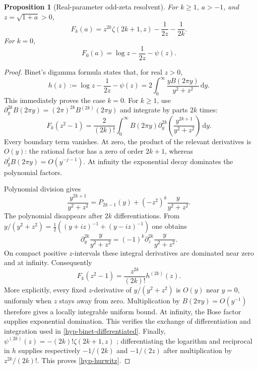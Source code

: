 \documentclass[11pt,a4paper]{article}
\numberwithin{equation}{section}
\newtheorem{proposition}[theorem]{Proposition}
\theoremstyle{definition}
\theoremstyle{remark}
\newcommand{\dd}{\,\mathrm d}
\begin{document}
\begin{proposition}[Real-parameter odd-zeta resolvent]\label{hyp-hurwitz-prop}
For $k\geq1$, $a>-1$, and $z=\sqrt{1+a}>0$,
\begin{equation}\label{hyp-hurwitz}
F_k(a)=z^{2k}\zeta(2k+1,z)-\frac1{2z}-\frac1{2k}.
\end{equation}
For $k=0$,
\begin{equation}\label{hyp-digamma}
F_0(a)=\log z-\frac1{2z}-\psi(z).
\end{equation}
\end{proposition}
\begin{proof}
Binet's digamma formula \cite{dlmf-binet} states that, for real $z>0$,
\begin{equation}\label{hyp-binet-base}
h(z):=\log z-\frac1{2z}-\psi(z)
=2\int_0^\infty\frac{yB(2\pi y)}{y^2+z^2}\dd y.
\end{equation}
This immediately proves the case $k=0$. For $k\geq1$, use
$\partial_y^{2k}B(2\pi y)=(2\pi)^{2k}B^{(2k)}(2\pi y)$
and integrate by parts $2k$ times:
\[
F_k(z^2-1)=\frac2{(2k)!}\int_0^\infty B(2\pi y)
\partial_y^{2k}\!\left(\frac{y^{2k+1}}{y^2+z^2}\right)\dd y.
\]
Every boundary term vanishes. At zero, the product of the relevant
derivatives is $O(y)$: the rational factor has a zero of order
$2k+1$, whereas $\partial_y^jB(2\pi y)=O(y^{-j-1})$.
At infinity the exponential decay dominates the polynomial factors.

Polynomial division gives
\[
\frac{y^{2k+1}}{y^2+z^2}
=P_{2k-1}(y)+(-z^2)^k\frac{y}{y^2+z^2}.
\]
The polynomial disappears after $2k$ differentiations. From
$y/(y^2+z^2)=\tfrac12((y+iz)^{-1}+(y-iz)^{-1})$ one obtains
\[
\partial_y^{2k}\frac{y}{y^2+z^2}
=(-1)^k\partial_z^{2k}\frac{y}{y^2+z^2}.
\]
On compact positive $z$-intervals these integral derivatives are dominated
near zero and at infinity. Consequently
\begin{equation}\label{hyp-binet-differentiated}
F_k(z^2-1)=\frac{z^{2k}}{(2k)!}h^{(2k)}(z).
\end{equation}
More explicitly, every fixed $z$-derivative of
$y/(y^2+z^2)$ is $O(y)$ near $y=0$, uniformly when $z$ stays
away from zero. Multiplication by $B(2\pi y)=O(y^{-1})$
therefore gives a locally integrable uniform bound. At infinity,
the Bose factor supplies exponential domination. This verifies the
exchange of differentiation and integration used in
\eqref{hyp-binet-differentiated}.
Finally,
$\psi^{(2k)}(z)=-(2k)!\zeta(2k+1,z)$
\cite{dlmf-hurwitz}; differentiating the logarithm and reciprocal in
$h$ supplies respectively $-1/(2k)$ and $-1/(2z)$ after multiplication
by $z^{2k}/(2k)!$. This proves \eqref{hyp-hurwitz}.
\end{proof}
\end{document}

